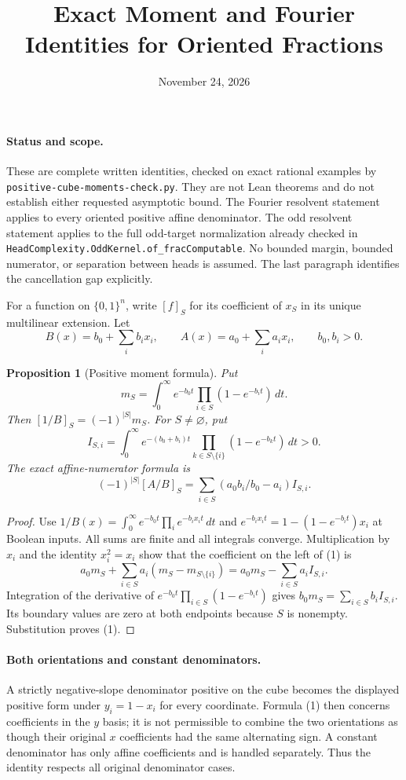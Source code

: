 \documentclass[11pt]{article}
\title{Exact Moment and Fourier Identities for Oriented Fractions}
\author{}
\date{November 24, 2026}
\newtheorem{proposition}{Proposition}
\begin{document}
\maketitle

\paragraph{Status and scope.}
These are complete written identities, checked on exact rational
examples by \texttt{positive-cube-moments-check.py}. They are not Lean
theorems and do not establish either requested asymptotic bound.
The Fourier resolvent statement applies to every oriented positive
affine denominator. The odd resolvent statement applies to the full
odd-target normalization already checked in
\texttt{HeadComplexity.OddKernel.of\_fracComputable}.
No bounded margin, bounded numerator, or separation between heads is
assumed. The last paragraph identifies the cancellation gap explicitly.

For a function on $\{0,1\}^n$, write $[f]_S$ for its coefficient of
$x_S$ in its unique multilinear extension. Let
\[
 B(x)=b_0+\sum_i b_ix_i,\qquad
 A(x)=a_0+\sum_i a_ix_i,\qquad b_0,b_i>0.
\]

\begin{proposition}[Positive moment formula]
Put
\[
 m_S=\int_0^\infty e^{-b_0t}
                \prod_{i\in S}(1-e^{-b_it})\,dt.
\]
Then $[1/B]_S=(-1)^{|S|}m_S$. For $S\ne\varnothing$, put
\[
 I_{S,i}=\int_0^\infty e^{-(b_0+b_i)t}
             \prod_{k\in S\setminus\{i\}}(1-e^{-b_kt})\,dt>0.
\]
The exact affine-numerator formula is
\[
 (-1)^{|S|}[A/B]_S
       =\sum_{i\in S}(a_0b_i/b_0-a_i)I_{S,i}.                 \tag{1}
\]
\end{proposition}
\begin{proof}
Use $1/B(x)=\int_0^\infty e^{-b_0t}\prod_i e^{-b_ix_it}\,dt$ and
$e^{-b_ix_it}=1-(1-e^{-b_it})x_i$ at Boolean inputs. All sums are finite
and all integrals converge. Multiplication by $x_i$ and the identity
$x_i^2=x_i$ show that the coefficient on the left of (1) is
\[
 a_0m_S+\sum_{i\in S}a_i(m_S-m_{S\setminus\{i\}})
             =a_0m_S-\sum_{i\in S}a_iI_{S,i}.
\]
Integration of the derivative of
$e^{-b_0t}\prod_{i\in S}(1-e^{-b_it})$ gives
$b_0m_S=\sum_{i\in S}b_iI_{S,i}$. Its boundary values are zero at
both endpoints because $S$ is nonempty. Substitution proves (1).
\end{proof}

\paragraph{Both orientations and constant denominators.}
A strictly negative-slope denominator positive on the cube becomes
the displayed positive form under $y_i=1-x_i$ for every coordinate.
Formula (1) then concerns coefficients in the $y$ basis; it is not
permissible to combine the two orientations as though their original
$x$ coefficients had the same alternating sign. A constant denominator
has only affine coefficients and is handled separately. Thus the
identity respects all original denominator cases.
\end{document}
